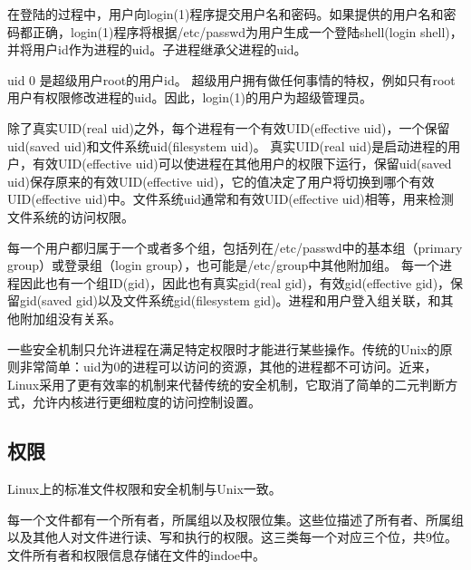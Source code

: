 在登陆的过程中，用户向login(1)程序提交用户名和密码。如果提供的用户名和密码都正确，login(1)程序将根据/etc/passwd为用户生成一个登陆shell(login shell)，并将用户id作为进程的uid。子进程继承父进程的uid。

uid 0 是超级用户root的用户id。 超级用户拥有做任何事情的特权，例如只有root用户有权限修改进程的uid。因此，login(1)的用户为超级管理员。

除了真实UID(real uid)之外，每个进程有一个有效UID(effective uid)，一个保留uid(saved uid)和文件系统uid(filesystem uid)。 真实UID(real uid)是启动进程的用户，有效UID(effective uid)可以使进程在其他用户的权限下运行，保留uid(saved uid)保存原来的有效UID(effective uid)，它的值决定了用户将切换到哪个有效UID(effective uid)中。文件系统uid通常和有效UID(effective uid)相等，用来检测文件系统的访问权限。

每一个用户都归属于一个或者多个组，包括列在/etc/passwd中的基本组（primary group）或登录组（login group），也可能是/etc/group中其他附加组。 每一个进程因此也有一个组ID(gid)，因此也有真实gid(real gid)，有效gid(effective gid)，保留gid(saved gid)以及文件系统gid(filesystem gid)。进程和用户登入组关联，和其他附加组没有关系。

一些安全机制只允许进程在满足特定权限时才能进行某些操作。传统的Unix的原则非常简单：uid为0的进程可以访问的资源，其他的进程都不可访问。近来，Linux采用了更有效率的机制来代替传统的安全机制，它取消了简单的二元判断方式，允许内核进行更细粒度的访问控制设置。

\subsection{权限}

Linux上的标准文件权限和安全机制与Unix一致。

每一个文件都有一个所有者，所属组以及权限位集。这些位描述了所有者、所属组以及其他人对文件进行读、写和执行的权限。这三类每一个对应三个位，共9位。 文件所有者和权限信息存储在文件的indoe中。


